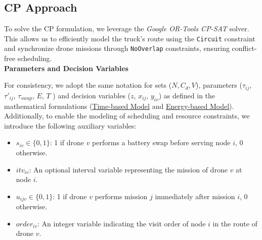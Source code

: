 \documentclass[3p, authoryear, 11pt]{elsarticle}
\begin{document}





\subsection{CP Approach}

To solve the CP formulation, we leverage the \textit{Google OR-Tools CP-SAT} solver. This allows us to efficiently model the truck's route using the \texttt{Circuit} constraint and synchronize drone missions through \texttt{NoOverlap} constraints, ensuring conflict-free scheduling.
\\

\noindent \textbf{Parameters and Decision Variables} 

For consistency, we adopt the same notation for sets ($N, C_d, V$), parameters ($\tau_{ij}$, $\tau'_{ij}$, $\tau_{swap}$, $E$, $T$ ) and decision variables ($z$, $x_{ij}$, $y_{iv}$) as defined in the mathematical formulations (\hyperref[sec:time_model_math]{Time-based Model} and \hyperref[sec:energy_model_math]{Energy-based Model}). Additionally, to enable the modeling of scheduling and resource constraints, we introduce the following auxiliary variables:

\begin{itemize}
    \item $s_{iv} \in \{0, 1\}$: 1 if drone $v$ performs a battery swap before serving node $i$, 0 otherwise.
    \item $itv_{iv}$: An optional interval variable representing the mission of drone $v$ at node $i$.
    \item $u_{ijv} \in \{0, 1\}$: 1 if drone $v$ performs mission $j$ immediately after mission $i$, 0 otherwise.
    \item $order_{iv}$: An integer variable indicating the visit order of node $i$ in the route of drone $v$.
\end{itemize} 
\end{document}
